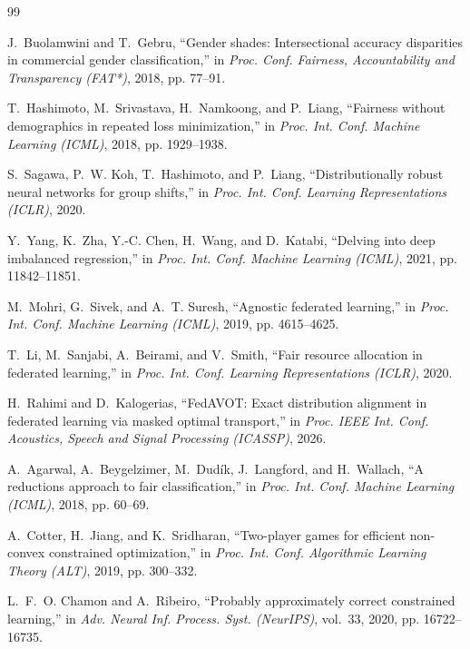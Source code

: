 \documentclass{article}
\theoremstyle{definition}
\begin{document}
\balance
\begin{thebibliography}{99}\setlength{\itemsep}{-2pt}\small

J.~Buolamwini and T.~Gebru, ``Gender shades: Intersectional accuracy disparities
in commercial gender classification,'' in \emph{Proc. Conf. Fairness,
Accountability and Transparency (FAT*)}, 2018, pp. 77--91.

T.~Hashimoto, M.~Srivastava, H.~Namkoong, and P.~Liang, ``Fairness without
demographics in repeated loss minimization,'' in \emph{Proc. Int. Conf. Machine
Learning (ICML)}, 2018, pp. 1929--1938.

S.~Sagawa, P.~W. Koh, T.~Hashimoto, and P.~Liang, ``Distributionally robust
neural networks for group shifts,'' in \emph{Proc. Int. Conf. Learning
Representations (ICLR)}, 2020.

Y.~Yang, K.~Zha, Y.-C. Chen, H.~Wang, and D.~Katabi, ``Delving into deep
imbalanced regression,'' in \emph{Proc. Int. Conf. Machine Learning (ICML)},
2021, pp. 11842--11851.

M.~Mohri, G.~Sivek, and A.~T. Suresh, ``Agnostic federated learning,'' in
\emph{Proc. Int. Conf. Machine Learning (ICML)}, 2019, pp. 4615--4625.

T.~Li, M.~Sanjabi, A.~Beirami, and V.~Smith, ``Fair resource allocation in
federated learning,'' in \emph{Proc. Int. Conf. Learning Representations
(ICLR)}, 2020.

H.~Rahimi and D.~Kalogerias, ``FedAVOT: Exact distribution alignment in
federated learning via masked optimal transport,'' in \emph{Proc. IEEE Int.
Conf. Acoustics, Speech and Signal Processing (ICASSP)}, 2026.

A.~Agarwal, A.~Beygelzimer, M.~Dud\'{i}k, J.~Langford, and H.~Wallach, ``A
reductions approach to fair classification,'' in \emph{Proc. Int. Conf. Machine
Learning (ICML)}, 2018, pp. 60--69.

A.~Cotter, H.~Jiang, and K.~Sridharan, ``Two-player games for efficient
non-convex constrained optimization,'' in \emph{Proc. Int. Conf. Algorithmic
Learning Theory (ALT)}, 2019, pp. 300--332.

L.~F.~O. Chamon and A.~Ribeiro, ``Probably approximately correct constrained
learning,'' in \emph{Adv. Neural Inf. Process. Syst. (NeurIPS)}, vol.~33, 2020,
pp. 16722--16735.


\end{thebibliography}
\end{document}
